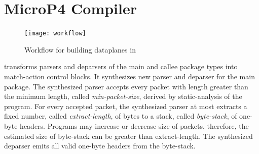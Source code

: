 \documentclass[letterpaper,twocolumn,10pt]{article}
\begin{document}



\section{MicroP4 Compiler}
\label{sec:compiler}

\begin{figure}[tbh]
  \centering
  \texttt{[image: workflow]}
  \caption{Workflow for building dataplanes in \ulang}
  \label{fig:workflow}
\end{figure}
\ucomp transforms parsers and deparsers of the main and callee package types into match-action control blocks.
It synthesizes new parser and deparser for the main package.
The synthesized parser accepts every packet with length greater than the minimum length, called \emph{min-packet-size}, derived by static-analysis of the program.
For every accepted packet, the synthesized parser at most extracts a fixed number, called \emph{extract-length}, of bytes to a stack, called \emph{byte-stack}, of one-byte headers.
Programs may increase or decrease size of packets, therefore, the estimated size of byte-stack can be greater than extract-length.
The synthesized deparser emits all valid one-byte headers from the byte-stack.
\end{document}
